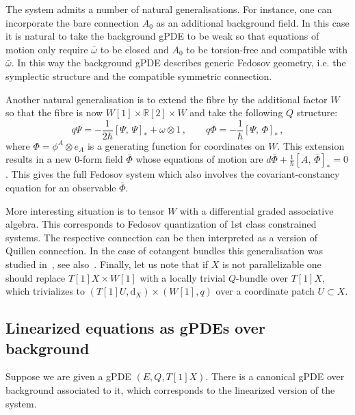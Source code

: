 \documentclass[a4paper,12pt]{article}
\numberwithin{equation}{section} %
\newcommand{\dx}{\mathrm{d}_X}
\newcommand{\tensor}{\otimes}
\newcommand{\qcommut}[2]{[#1{,}\,#2]_*}
\newcommand{\fR}{\mathbb{R}}
\begin{document}
The system admits a number of natural generalisations. For instance, one can incorporate the bare connection $A_0$ as an additional background field. In this case it is natural to take the background gPDE to be weak so that equations of motion only require  $\bar\omega$ to be closed and $A_0$ to be torsion-free and compatible with $\bar\omega$.  In this way the background gPDE describes generic Fedosov geometry, i.e. the symplectic structure and the compatible symmetric connection.

Another natural generalisation is to extend the fibre by the additional factor $W$ so that the fibre is now $W[1]\times \fR[2] \times W$ and take
the following $Q$ structure:
\begin{equation}
q\Psi=-\frac{1}{2\hbar}\qcommut{\Psi}{\Psi}+\omega\tensor 1\,, \qquad q\Phi=-\frac{1}{\hbar}\qcommut{\Psi}{\Phi}\,,
\end{equation}
where $\Phi=\phi^A\tensor e_A$ is a generating function for coordinates on $W$. This extension results in a new 0-form field $\bar\Phi$  whose equations of motion are $d\bar\Phi+\frac{1}{\hbar}\qcommut{A}{\bar \Phi}=0$. This gives the full Fedosov system which also involves the covariant-constancy equation for an observable $\bar \Phi$.

More interesting situation is to tensor $W$ with a differential graded associative algebra. This corresponds to Fedosov quantization of 1st class constrained systems. The respective connection can be then interpreted as a version of Quillen connection. In the case of cotangent bundles this generalisation was studied in~\cite{Grigoriev:2006tt}, see also~\cite{Grigoriev:2023lcc}.
Finally, let us note that if $X$ is not parallelizable one should replace $T[1]X\times W[1]$ with a locally trivial $Q$-bundle over $T[1]X$, which  trivializes to $(T[1]U,\dx) \times (W[1],q)$ over a coordinate patch $U\subset X$. 



\subsection{Linearized equations as gPDEs over background} \label{subsec:Linearized_systems}
Suppose we are given a gPDE $(E,Q,T[1]X)$. There is a canonical gPDE over background associated to it, which corresponds to the linearized version of the system. 
\end{document}
